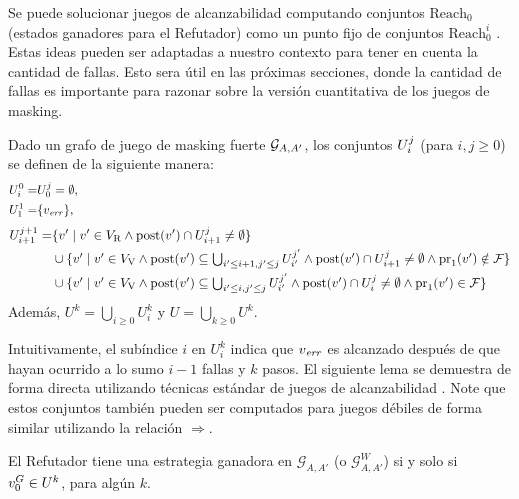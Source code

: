 	Se puede solucionar juegos de alcanzabilidad computando conjuntos $\text{Reach}_0$ (estados ganadores para el Refutador) como un punto fijo de conjuntos $\text{Reach}^i_0$  \cite{Jurd11}.
	Estas ideas pueden ser adaptadas a nuestro contexto para tener en cuenta la cantidad de fallas. Esto sera útil en las próximas secciones, donde la cantidad de fallas es importante para razonar sobre la versión cuantitativa de los juegos de masking.
\begin{defi}\label{def:U} Dado un grafo de juego de masking fuerte $\mathcal{G}_{A, A'}$, 
los conjuntos $U^j_i$ (para $i,j \geq 0$) se definen de la siguiente manera:
\begin{align*}
  U^0_i =& U^j_0 = \emptyset,  \label{def:of:Uji} \\
  U_1^1 =&  \{\ErrorSt\},
  \hspace{12.5cm} {}\notag
\end{align*}
\begin{align*}
  U_{i+1}^{j+1} =&
    \{v' \mid v' \in V_{\mathrm{R}} \wedge \operatorname{post}(v') \cap U_{i+1}^j \neq \emptyset\} \\
    &\textstyle\cup
    \{v' \mid v' \in V_{\mathrm{V}} \wedge \operatorname{post}(v') \subseteq \bigcup_{i'\leq i+1, j' \leq j}U_{i'}^{j'} \wedge \operatorname{post}(v') \cap U^j_{i+1} \neq \emptyset \wedge \operatorname{pr}_{1}(v') \notin \mathcal{F} \} \\
    &\textstyle \cup
    \{v' \mid  v' \in V_{\mathrm{V}} \wedge \operatorname{post}(v') \subseteq \bigcup_{i'\leq i, j' \leq j}U_{i'}^{j'} \wedge \operatorname{post}(v') \cap U^j_i \neq \emptyset \wedge \operatorname{pr}_{1}(v') \in \mathcal{F} \}
\end{align*}
Además, $U^k = \bigcup_{i \geq 0} U_i^k$ y $U = \bigcup_{k \geq 0} U^k$.
\end{defi}
Intuitivamente, el subíndice $i$ en $U^k_i$ indica que $v_{\mathit{err}}$ es alcanzado después de que hayan ocurrido a lo sumo $i-1$ fallas y $k$ pasos.
El siguiente lema se demuestra de forma directa utilizando técnicas estándar de juegos de alcanzabilidad \cite{AlfaroHK07}.
	Note que estos conjuntos también pueden ser computados para juegos débiles de forma similar utilizando la relación $\Rightarrow$.
\begin{lem} \label{lemma:RefWinStrat} El Refutador tiene una estrategia ganadora en $\mathcal{G}_{A, A'}$ (o $\mathcal{G}^W_{A, A'}$) si y solo si $v_0^G \in U^k$, para algún $k$.
\end{lem}

